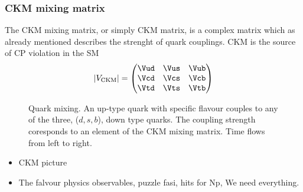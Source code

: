 \subsubsection{CKM mixing matrix}
The CKM mixing matrix, or simply CKM matrix, is a complex matrix which as already mentioned describes the
strenght of quark couplings.
CKM is the source of CP violation in the SM
\begin{equation}
  \left|V_{\text{CKM}}\right| = \begin{pmatrix} \Vud & \Vus & \Vub \\ \Vcd & \Vcs & \Vcb \\ \Vtd & \Vts & \Vtb \end{pmatrix}
      \label{CKMmatrix}
  \end{equation}

\begin{figure}[h]
  \centering
  {\sffamily }
  \caption{Quark mixing. An up-type quark with specific flavour couples to any of the three, ($d,s,b$), down type quarks.
           The coupling strength coresponds to an element of the CKM mixing matrix. Time flows from left to right.}
  \label{QuarkMixing}
\end{figure}




\begin{itemize}
  \item CKM picture
  \item The falvour physics observables, puzzle fasi, hits for Np, We need everything.
\end{itemize}
